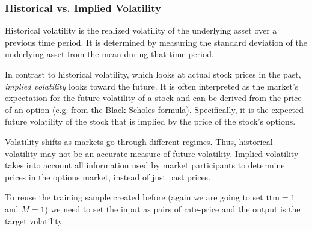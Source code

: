\begin{attention}
\subsubsection{Historical vs. Implied Volatility}
\label{historical-vs.-implied-volatility}

Historical volatility is the realized volatility of the underlying asset over a previous time period. It is determined by measuring the standard deviation of the underlying asset from the mean during that time period.

In contrast to historical volatility, which looks at actual stock prices in the past, \emph{implied volatility} looks toward the future. It is often interpreted as the market's expectation for the future volatility of a stock and can be derived from the price of an option (e.g. from the Black-Scholes formula). Specifically, it is the expected future volatility of the stock that is implied by the price of the stock's options.


Volatility shifts as markets go through different regimes. Thus, historical volatility may not be an accurate measure of future volatility. Implied volatility takes into account all information used by market participants to  determine prices in the options market, instead of just past prices.

\end{attention}

To reuse the training sample created before (again we are going to set \(\mathrm{ttm}=1\) and \(M=1\)) we need to set the input as pairs of rate-price and the output is the target volatility.

